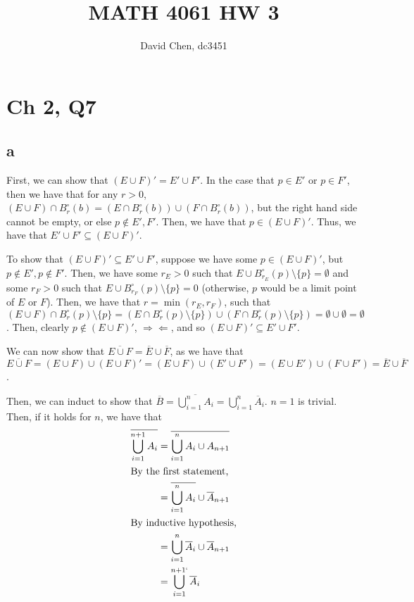 \documentclass[12pt,letterpaper]{article}
\title{MATH 4061 HW 3}
\author{David Chen, dc3451}
\theoremstyle{definition}
\newcommand{\contra}{\Rightarrow\!\Leftarrow}
\begin{document}
\maketitle

\section*{Ch 2, Q7}

\subsection*{a}

First, we can show that $(E \cup F)' = E' \cup F'$. In the case that $p \in E'$ or $p \in F'$, then we have that for any $r > 0$, $(E \cup F) \cap B_{r}^{\circ}(b) = (E \cap B_{r}^{\circ}(b)) \cup (F \cap B_{r}^{\circ}(b))$, but the right hand side cannot be empty, or else $p \notin E', F'$. Then, we have that $p \in (E \cup F)'$. Thus, we have that $E' \cup F' \subseteq (E \cup F)'$.

To show that $(E \cup F)' \subseteq E' \cup F'$, suppose we have some $p \in (E \cup F)'$, but $p \notin E', p \notin F'$. Then, we have some $r_{E} > 0$ such that $E \cup B_{r_{E}}^{\circ}(p) \setminus \{p\} = \emptyset$ and some $r_{F} > 0$ such that $E \cup B_{r_{F}}^{\circ}(p)  \setminus \{p\} = 0$ (otherwise, $p$ would be a limit point of $E$ or $F$). Then, we have that $r = \min(r_{E},r_{F})$, such that $(E \cup F) \cap B_{r}^{\circ}(p) \setminus \{p\}  = (E \cap B_{r}^{\circ}(p)  \setminus \{p\} ) \cup (F \cap B_{r}^{\circ}(p) \setminus \{p\} ) = \emptyset \cup \emptyset = \emptyset$. Then, clearly $p \notin (E \cup F)'$, $\contra$, and so $(E \cup F)' \subseteq E' \cup F'$.

We can now show that $\overline{E \cup F} = \overline{E} \cup \overline{F}$, as we have that $\overline{E \cup F} = (E \cup F) \cup (E \cup F)' = (E \cup F) \cup (E' \cup F') = (E \cup E') \cup (F \cup F') = \overline{E} \cup \overline{F}$.

Then, we can induct to show that $\overline{B} = \overline{\bigcup_{i=1}^{n}A_{i}} = \bigcup_{i=1}^{n}\overline{A}_{i}$. $n = 1$ is trivial. Then, if it holds for $n$, we have that
\begin{align*}
  \overline{\bigcup_{i=1}^{n+1}A_{i}} &= \overline{\bigcup_{i=1}^{n}{A}_{i} \cup A_{n+1}} \\
  \intertext{By the first statement,}
                                      &= \overline{\bigcup_{i=1}^{n}A_{i}} \cup \overline{A}_{n+1} \\
  \intertext{By inductive hypothesis,}
                                      &= \bigcup_{i=1}^{n}\overline{A}_{i} \cup \overline{A}_{n+1} \\
                                      &= \bigcup_{i=1}^{n+1`}\overline{A}_{i}\\
\end{align*}
\end{document}
